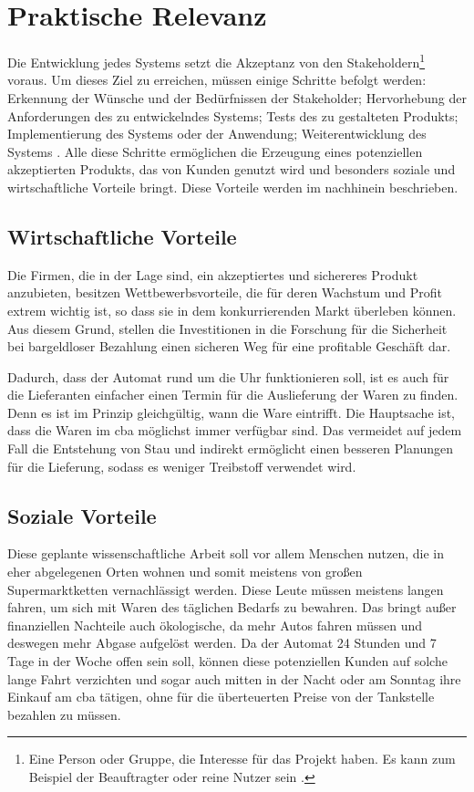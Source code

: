 \section{Praktische Relevanz}

Die Entwicklung jedes Systems setzt die Akzeptanz von den Stakeholdern\footnote{Eine Person oder Gruppe, die Interesse 
für das Projekt haben. Es kann zum Beispiel der Beauftragter oder reine Nutzer sein \cite{refip:HSSI}.} voraus. Um dieses Ziel 
zu erreichen, müssen einige Schritte befolgt werden: Erkennung der Wünsche und der Bedürfnissen der Stakeholder; Hervorhebung 
der Anforderungen des zu entwickelndes Systems; Tests des zu gestalteten Produkts; Implementierung des Systems oder 
der Anwendung; Weiterentwicklung des Systems \cite{refbook:RECR}. Alle diese Schritte ermöglichen die Erzeugung eines 
potenziellen akzeptierten Produkts, das von Kunden genutzt wird und besonders soziale und wirtschaftliche Vorteile bringt.
Diese Vorteile werden im nachhinein beschrieben.


\subsection{Wirtschaftliche Vorteile}

Die Firmen, die in der Lage sind, ein akzeptiertes und sichereres Produkt anzubieten, besitzen Wettbewerbsvorteile, 
die für deren Wachstum und Profit extrem wichtig ist, so dass sie in dem konkurrierenden Markt überleben können. Aus 
diesem Grund, stellen die Investitionen in die Forschung für die Sicherheit bei bargeldloser Bezahlung einen sicheren 
Weg für eine profitable Geschäft dar.


Dadurch, dass der Automat rund um die Uhr funktionieren soll, ist es auch für die Lieferanten einfacher einen Termin 
für die Auslieferung der Waren zu finden. Denn es ist im Prinzip gleichgültig, wann die Ware eintrifft. Die Hauptsache 
ist, dass die Waren im \acrshort{cba} möglichst immer verfügbar sind. Das vermeidet auf jedem Fall die Entstehung von 
Stau und indirekt ermöglicht einen besseren Planungen  für die Lieferung, sodass es weniger Treibstoff verwendet wird.


\subsection{Soziale Vorteile}

Diese geplante wissenschaftliche Arbeit soll vor allem Menschen nutzen, die in eher abgelegenen Orten wohnen und somit 
meistens von großen Supermarktketten vernachlässigt werden. Diese Leute müssen meistens langen fahren, um sich mit
Waren des täglichen Bedarfs zu bewahren. Das bringt außer finanziellen Nachteile auch ökologische, da mehr Autos fahren 
müssen und deswegen mehr Abgase aufgelöst werden. Da der Automat 24 Stunden und 7 Tage in der Woche offen sein soll,
können diese potenziellen Kunden auf solche lange Fahrt verzichten und sogar auch mitten in der Nacht oder am Sonntag
ihre Einkauf am \acrshort{cba} tätigen, ohne für die überteuerten Preise von der Tankstelle bezahlen zu müssen. 

